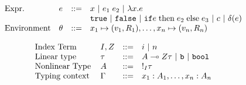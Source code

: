 
\[\begin{array}{llll}
\mbox{Expr.} & e & ::= & x ~|~ e_1 \; e_2 
 ~|~ \lambda x. e 
    \\
             & & &  \mathtt{true} ~|~ \mathtt{false} ~|~
  \mathtt{if}  e \mbox{\;then\;} e_2 \mbox{\;else\;} e_3 ~|~
c ~|~ \delta(e)  \\
\mbox{Environment} & \theta & ::= & x_1 \mapsto (v_1, R_1), \ldots, x_n \mapsto (v_n,R_n)
\end{array}\]

\[
\begin{array}{llll}
  \mbox{Index Term} & I, Z & ::= &     i ~|~ n \\
  \mbox{Linear type} & \tau &::=  &  A \multimap{Z} \tau ~|~
                                     \mathtt{b} ~|~ \mathtt{bool} \\
  \mbox{Nonlinear Type} & A & ::= & !_{I} \tau   \\
  \mbox{Typing context } & \Gamma & ::= & x_1 : A_1, \ldots,
                                          x_n : A_n
\end{array}
\]


